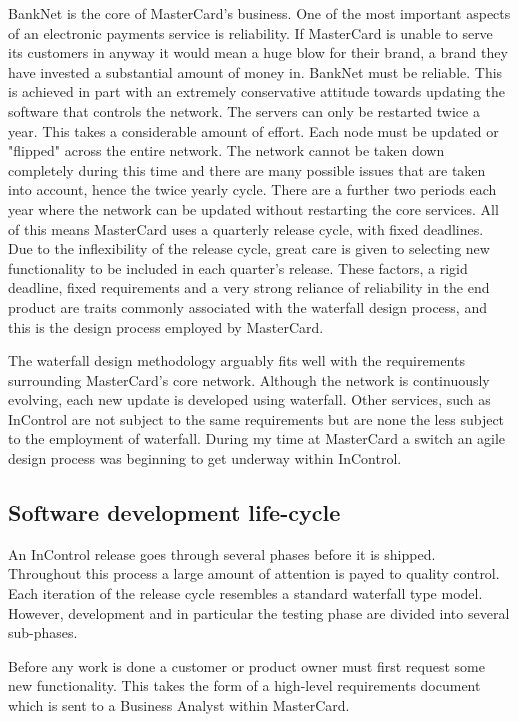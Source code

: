 \documentclass[a4paper, 11pt, titlepage]{article}
\begin{document}
BankNet is the core of MasterCard’s business. One of the most important aspects of an electronic payments service is reliability. If MasterCard is unable to serve its customers in anyway it would mean a huge blow for their brand, a brand they have invested a substantial amount of money in. BankNet must be reliable. This is achieved in part with an extremely conservative attitude towards updating the software that controls the network. The servers can only be restarted twice a year. This takes a considerable amount of effort. Each node must be updated or "flipped" across the entire network. The network cannot be taken down completely during this time and there are many possible issues that are taken into account, hence the twice yearly cycle. There are a further two periods each year where the network can be updated without restarting the core services. All of this means MasterCard uses a quarterly release cycle, with fixed deadlines. Due to the inflexibility of the release cycle, great care is given to selecting new functionality to be included in each quarter’s release. These factors, a rigid deadline, fixed requirements and a very strong reliance of reliability in the end product are traits commonly associated with the waterfall design process, and this is the design process employed by MasterCard. 
 
The waterfall design methodology arguably fits well with the requirements surrounding MasterCard’s core network. Although the network is continuously evolving, each new update is developed using waterfall. Other services, such as InControl are not subject to the same requirements but are none the less subject to the employment of waterfall. During my time at MasterCard a switch an agile design process was beginning to get underway within InControl. 
 
\subsection{Software development life-cycle}

An InControl release goes through several phases before it is shipped. Throughout this process a large amount of attention is payed to quality control. Each iteration of the release cycle resembles a standard waterfall type model. However, development and in particular the testing phase are divided into several sub-phases.

Before any work is done a customer or product owner must first request some new functionality. This takes the form of a high-level requirements document which is sent to a Business Analyst within MasterCard.
\end{document}

